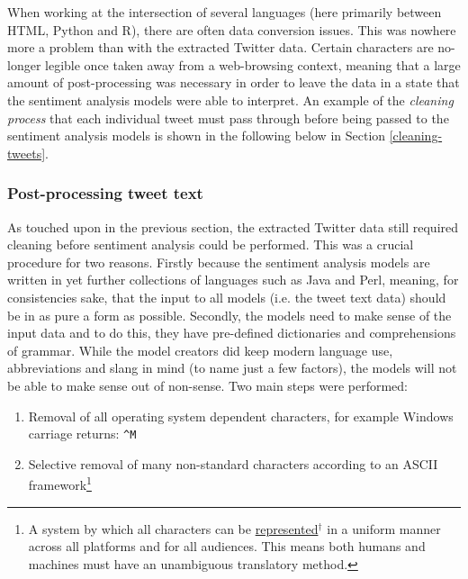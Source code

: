 \documentclass{article}
\begin{document}
When working at the intersection of several languages (here primarily between HTML, Python and R), there are often data conversion issues. This was nowhere more a problem than with the extracted Twitter data. Certain characters are no-longer legible once taken away from a web-browsing context, meaning that a large amount of post-processing was necessary in order to leave the data in a state that the sentiment analysis models were able to interpret. An example of the \emph{cleaning process} that each individual tweet must pass through before being passed to the sentiment analysis models is shown in the following below in Section \ref{cleaning-tweets}.


\subsubsection{Post-processing tweet text \label{cleaning-tweets}}
\label{sec-1-3-5}

As touched upon in the previous section, the extracted Twitter data still required cleaning before sentiment analysis could be performed. This was a crucial procedure for two reasons. Firstly because the sentiment analysis models are written in yet further collections of languages such as Java and Perl, meaning, for consistencies sake, that the input to all models (i.e. the tweet text data) should be in as pure a form as possible. Secondly, the models need to make sense of the input data and to do this, they have pre-defined dictionaries and comprehensions of grammar. While the model creators did keep modern language use, abbreviations and slang in mind (to name just a few factors), the models will not be able to make sense out of non-sense. \newline Two main steps were performed:

\begin{enumerate}
\item Removal of all operating system dependent characters, for example Windows carriage returns: \texttt{\textasciicircum{}M}

\item Selective removal of many non-standard characters according to an ASCII framework\footnote{A system by which all characters can be \href{http://www.asciitable.com/}{represented$^{\dag{}}$} in a uniform manner across all platforms and for all audiences. This means both humans and machines must have an unambiguous translatory method.}
\end{enumerate}
\end{document}
